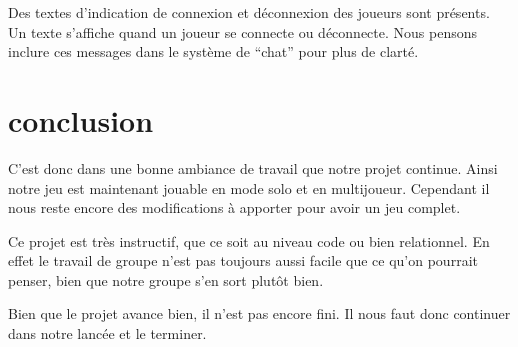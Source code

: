 \documentclass{article}
\begin{document}
    Des textes d’indication de connexion et déconnexion des joueurs sont présents. Un texte s’affiche quand un joueur se connecte ou déconnecte. Nous pensons inclure ces messages dans le système de “chat” pour plus de clarté.



\newpage

\section{conclusion}

\quad

\quad

C’est donc dans une bonne ambiance de travail que notre projet continue. Ainsi notre jeu est maintenant jouable en mode solo et en multijoueur. Cependant il nous reste encore des modifications à apporter pour avoir un jeu complet. 

Ce projet est très instructif, que ce soit au niveau code ou bien relationnel. En effet le travail de groupe n’est pas toujours aussi facile que ce qu’on pourrait penser, bien que notre groupe s’en sort plutôt bien.

Bien que le projet avance bien, il n’est pas encore fini. Il nous faut donc continuer dans notre lancée et le terminer.

\quad

\quad
\end{document}
